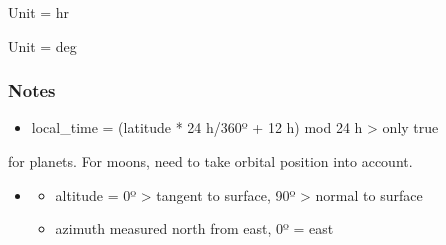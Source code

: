 \documentclass[letterpaper,10pt,english]{sphinxmanual}
\begin{document}
\begin{fulllineitems}

\begin{fulllineitems}
\label{\detokenize{nexoclom2/nexoclom2.particle_tracking.starting_point:nexoclom2.particle_tracking.starting_point.StartingPoint.local_time}}
\pysigstartsignatures
\pysigline
{}
\pysigstopsignatures
\sphinxAtStartPar
Unit = hr

\end{fulllineitems}



\begin{fulllineitems}

\pysigstartsignatures
\pysigline
{}
\pysigstopsignatures
\sphinxAtStartPar
Unit = deg

\end{fulllineitems}

\subsubsection*{Notes}
\begin{itemize}
\item {} 
\sphinxAtStartPar
local\_time = (latitude * 24 h/360º + 12 h) mod 24 h \sphinxhyphen{}\textgreater{} only true

\end{itemize}

\sphinxAtStartPar
for planets. For moons, need to take orbital position into account.
\begin{itemize}
\item {} \begin{description}
\begin{itemize}
\item {} 
\sphinxAtStartPar
altitude = 0º \sphinxhyphen{}\textgreater{} tangent to surface, 90º \sphinxhyphen{}\textgreater{} normal to surface

\item {} 
\sphinxAtStartPar
azimuth measured north from east, 0º = east

\end{itemize}

\end{description}


\end{itemize}
\end{fulllineitems}
\end{document}

